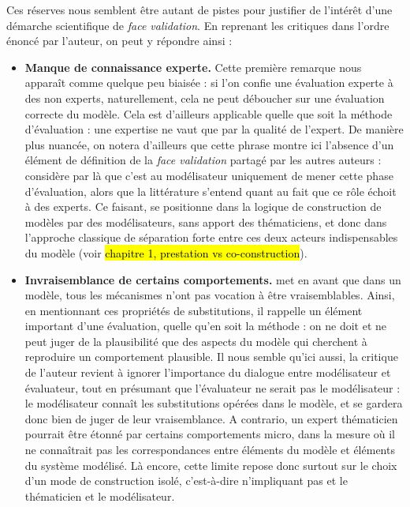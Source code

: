 Ces réserves nous semblent être autant de pistes pour justifier de l'intérêt d'une démarche scientifique de \textit{face validation}. En reprenant les critiques dans l'ordre énoncé par l'auteur, on peut y répondre ainsi :
\begin{itemize}
	\item \textbf{Manque de connaissance experte.}
	Cette première remarque nous apparaît comme quelque peu biaisée : si l'on confie une évaluation experte à des non experts, naturellement, cela ne peut déboucher sur une évaluation correcte du modèle.
	Cela est d'ailleurs applicable quelle que soit la méthode d'évaluation : une expertise ne vaut que par la qualité de l'expert.
	De manière plus nuancée, on notera d'ailleurs que cette phrase montre ici l'absence d'un élément de définition de la \textit{face validation} partagé par les autres auteurs :
	\citeauthor{hermann_validation_1967} considère par là que c'est au modélisateur uniquement de mener cette phase d'évaluation, alors que la littérature s'entend quant au fait que ce rôle échoit à des experts.
	Ce faisant, \citeauthor{hermann_validation_1967} se positionne dans la logique de construction de modèles par des modélisateurs, sans apport des thématiciens, et donc dans l'approche classique de séparation forte entre ces deux acteurs indispensables du modèle (voir \hl{chapitre 1, prestation vs co-construction}).
	
	\item \textbf{Invraisemblance de certains comportements.}
	\citeauthor{hermann_validation_1967} met en avant que dans un modèle, tous les mécanismes n'ont pas vocation à être vraisemblables.
	Ainsi, en mentionnant ces \og propriétés de substitutions\fg{}, il rappelle un élément important d'une évaluation, quelle qu'en soit la méthode :
	on ne doit et ne peut juger de la plausibilité que des aspects du modèle qui cherchent à reproduire un comportement plausible.
	Il nous semble qu'ici aussi, la critique de l'auteur revient à ignorer l'importance du dialogue entre modélisateur et évaluateur, tout en présumant que l'évaluateur ne serait pas le modélisateur :
	le modélisateur connaît les \og substitutions\fg{} opérées dans le modèle, et se gardera donc bien de juger de leur vraisemblance.
	A contrario, un expert thématicien pourrait être étonné par certains comportements micro, dans la mesure où il ne connaîtrait pas les correspondances entre éléments du modèle et éléments du système modélisé.
	Là encore, cette limite repose donc surtout sur le choix d'un mode de construction isolé, c'est-à-dire n'impliquant pas et le thématicien et le modélisateur.
	

\end{itemize}
